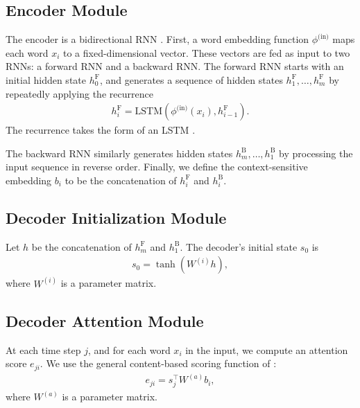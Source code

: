 \documentclass[11pt,letterpaper]{article}
\newcommand{\phiin}{\phi^{\text{(in)}}}
\newcommand\pl[1]{\textcolor{red}{[PL: #1]}}
\newcommand\rj[1]{\textcolor{blue}{[RJ: #1]}}
\renewcommand\pl[1]{}
\renewcommand\rj[1]{}
\begin{document}
\pl{
  Also need at least one (probably two) figure(s)
  to illustrate (i) the abstract model framework,
  and (ii) a concrete example.  Use the same example as in Figure 1.
}
\rj{First figure made.  Second figure seems like it would need to be quite big?}


\subsection{Encoder Module}
The encoder is a bidirectional RNN \cite{bahdanau2014neural}.
First, a word embedding function $\phiin$ 
maps each word $x_i$ to a fixed-dimensional vector.
These vectors are fed as input to two RNNs: a forward RNN and a backward RNN.
The forward RNN starts with an initial hidden state $h_0^{\text{F}}$,
and generates a sequence of hidden states $h_1^{\text{F}}, \dotsc, h_m^{\text{F}}$ by
repeatedly applying the recurrence 
\begin{align}
  h_i^{\text{F}} = \text{LSTM}(\phiin(x_i), h_{i-1}^{\text{F}}).
\end{align}
The recurrence takes the form of an LSTM \cite{hochreiter1997lstm}.
\pl{technically, does $h_i$ need to include the cell variables?}
\rj{In this case, yes. I didn't try excluding the cell.}
\pl{technically, LSTM refers to the entire model, not just one local update}
\rj{I've seen this phrasing elsewhere
e.g. http://arxiv.org/pdf/1409.0473v6.pdf bottom of page 2.
Do you think saying ``LSTM unit'' is better?}
The backward RNN similarly generates hidden states $h_m^{\text{B}}, \dotsc, h_1^{\text{B}}$
by processing the input sequence in reverse order.
Finally, we define 
the context-sensitive embedding
$b_i$ to be the concatenation of $h_i^{\text{F}}$ and $h_i^{\text{B}}$.
\pl{$\phiin(x_i)$ is notationally pretty clunky; come up with a single letter?}
\pl{what's $\phi(x_i)$?}
\rj{is this better?}

\subsection{Decoder Initialization Module}
Let $h$ be the concatenation of $h_m^{\text{F}}$ and $h_1^{\text{B}}$.
The decoder's initial state $s_0$ is
\begin{align}
  s_0 = \tanh(W^{(i)} h),
\end{align}
where $W^{(i)}$ is a parameter matrix.

\subsection{Decoder Attention Module}
At each time step $j$, and for each word $x_i$ in the input,
we compute an attention score $e_{ji}$.
We use the general content-based scoring function of
:
\begin{align}
  e_{ji} = s_j^\top W^{(a)} b_i,
\end{align}
where $W^{(a)}$ is a parameter matrix.
\end{document}
